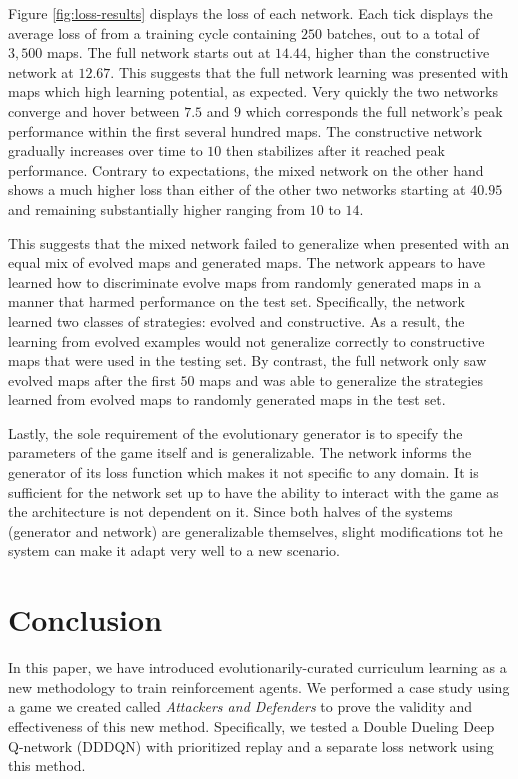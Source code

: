 \documentclass[letterpaper]{article} %
\begin{document}
Figure \ref{fig:loss-results} displays the loss of each network. Each tick displays the average loss of from a training cycle containing $250$ batches, out to a total of $3,500$ maps. The full network starts out at $14.44$, higher than the constructive network at $12.67$. This suggests that the full network learning was presented with maps which high learning potential, as expected. Very quickly the two networks converge and hover between $7.5$ and $9$ which corresponds the full network's peak performance within the first several hundred maps. The constructive network gradually increases over time to $10$ then stabilizes after it reached peak performance. Contrary to expectations, the mixed network on the other hand shows a much higher loss than either of the other two networks starting at $40.95$ and remaining substantially higher ranging from $10$ to $14$. 

This suggests that the mixed network failed to generalize when presented with an equal mix of evolved maps and generated maps. The network appears to have learned how to discriminate evolve maps from randomly generated maps in a manner that harmed performance on the test set. Specifically, the network learned two classes of strategies: evolved and constructive. As a result, the learning from evolved examples would not generalize correctly to constructive maps that were used in the testing set. By contrast, the full network only saw evolved maps after the first $50$ maps and was able to generalize the strategies learned from evolved maps to randomly generated maps in the test set.

Lastly, the sole requirement of the evolutionary generator is to specify the parameters of the game itself and is generalizable. The network informs the generator of its loss function which makes it not specific to any domain. It is sufficient for the network set up to have the ability to interact with the game  as the architecture is not dependent on it. Since both halves of the systems (generator and network) are generalizable themselves, slight modifications tot he system can make it adapt very well to a new scenario. 

\section{Conclusion}\label{sec:conclusion}
In this paper, we have introduced evolutionarily-curated curriculum learning as a new methodology to train reinforcement agents. We performed a case study using a game we created called \emph{Attackers and Defenders} to prove the validity and effectiveness of this new method. Specifically, we tested a Double Dueling Deep Q-network (DDDQN) with prioritized replay and a separate loss network using this method.
\end{document}
